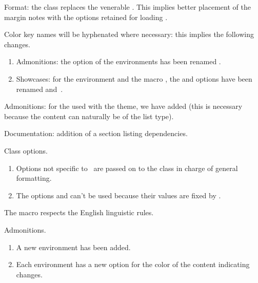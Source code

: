 \documentclass{tutodoc}
\begin{document}
\small

\begin{tdocbreak}
	\item Format: the  class replaces the venerable . This implies better placement of the margin notes with the options retained for loading .


	\item Color key names will be hyphenated where necessary: this implies the following changes.
	\begin{enumerate}
		\item Admonitions: the  option of the environments has been renamed .

		\item Showcases: for the environment  and the macro , the  and   options have been renamed  and \,.
	\end{enumerate}
\end{tdocbreak}


\begin{tdocfix}
	\item Admonitions: for the  used with the  theme, we have added  (this is necessary because the content can naturally be of the list type).
\end{tdocfix}


\begin{tdocnew}
	\item Documentation: addition of a section listing dependencies.

	\item Class options.
	\begin{enumerate}
		\item Options not specific to \thisproj\ are passed on to the class in charge of general formatting.

		\item The  options  and  can't be used because their values are fixed by \thisproj.
	\end{enumerate}

	\item The macro  respects the English linguistic rules.

	\item Admonitions.
	\begin{enumerate}
		\item A new environment  has been added.

		\item Each environment has a new option  for the color of the content indicating changes.
	\end{enumerate}
\end{tdocnew}
\end{document}
